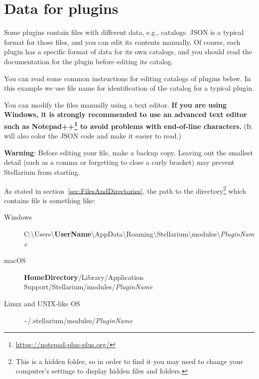 \section{Data for plugins}
\label{sec:Plugins:DataForPlugins}

Some plugins contain files with different data, e.g., catalogs. JSON is a
typical format for those files, and you can edit its contents manually. Of
course, each plugin has a specific format of data for its own catalogs, and
you should read the documentation for the plugin before editing its catalog.

You can read some common instructions for editing catalogs of plugins
below. In this example we use file name  for
identification of the catalog for a typical plugin.

You can modify the  files manually using a text
editor. \textbf{If you are using Windows, it is strongly recommended to
use an advanced text editor such as
Notepad++\footnote{\url{https://notepad-plus-plus.org/}} to avoid problems with
end-of-line characters.} (It will also color the JSON code and make it
easier to read.)

\textbf{Warning}: Before editing your  file, make a
backup copy. Leaving out the smallest detail (such as a comma or
forgetting to close a curly bracket) may prevent Stellarium from
starting.

As stated in section~\ref{sec:FilesAndDirectories}, the path to the
directory\footnote{This is a hidden folder, so in order to find it you
  may need to change your computer's settings to display hidden files
  and folders.} which contains  file is something
like:

\begin{description}
\item[Windows]
  C:\textbackslash Users\textbackslash\textbf{UserName}\textbackslash AppData\textbackslash Roaming\textbackslash Stellarium\textbackslash modules\textbackslash \textit{PluginName}
\item[macOS]
  \textbf{HomeDirectory}/Library/Application Support/Stellarium/modules/\textit{PluginName}
\item[Linux and UNIX-like OS]
  \textasciitilde{}/.stellarium/modules/\textit{PluginName}
\end{description}



